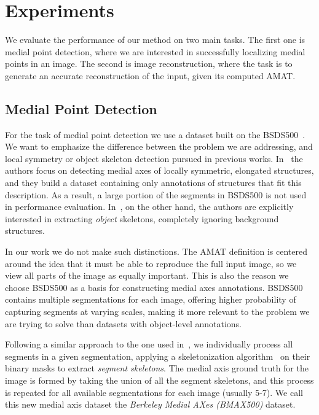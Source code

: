 \documentclass[10pt,twocolumn,letterpaper]{article}
\begin{document}
\section{Experiments}\label{sec:experiments}
We evaluate the performance of our method on two main tasks.
The first one is medial point detection, where we are interested in successfully localizing medial points
in an image.
The second is image reconstruction, where the task is to generate an accurate reconstruction of the input,
given its computed AMAT.
~

\subsection{Medial Point Detection}\label{sec:experiments:detection}
For the task of medial point detection we use a dataset built on the BSDS500~\cite{martin2001database,arbelaez2011contour}.
We want to emphasize the difference between the problem we are addressing, and local symmetry
or object skeleton detection pursued in previous works.
In~\cite{tsogkas2012learning} the authors focus on detecting medial axes of locally symmetric, elongated structures,
and they build a dataset containing only annotations of structures that fit this description.
As a result, a large portion of the segments in BSDS500 is not used in performance evaluation.
In~\cite{shen2016object}, on the other hand, the authors are explicitly interested in extracting \emph{object}
skeletons, completely ignoring background structures.

In our work we do not make such distinctions. 
The AMAT definition is centered around the idea that it must be able to reproduce the full input image,
so we view all parts of the image as equally important.
This is also the reason we choose BSDS500 as a basis for constructing medial axes annotations.
BSDS500 contains multiple segmentations for each image, offering higher probability of
capturing segments at varying scales, making it more relevant to the problem we are trying to solve
than datasets with object-level annotations.

Following a similar approach to the one used in~\cite{tsogkas2012learning}, 
we individually process all segments in a given segmentation, applying a skeletonization 
algorithm~\cite{telea2002augmented} on their binary masks to extract \emph{segment skeletons}.
The medial axis ground truth for the image is formed by taking the union of all the segment skeletons, and this
process is repeated for all available segmentations for each image (usually 5-7).
We call this new medial axis dataset the \emph{Berkeley Medial AXes (BMAX500)} dataset.
\end{document}

